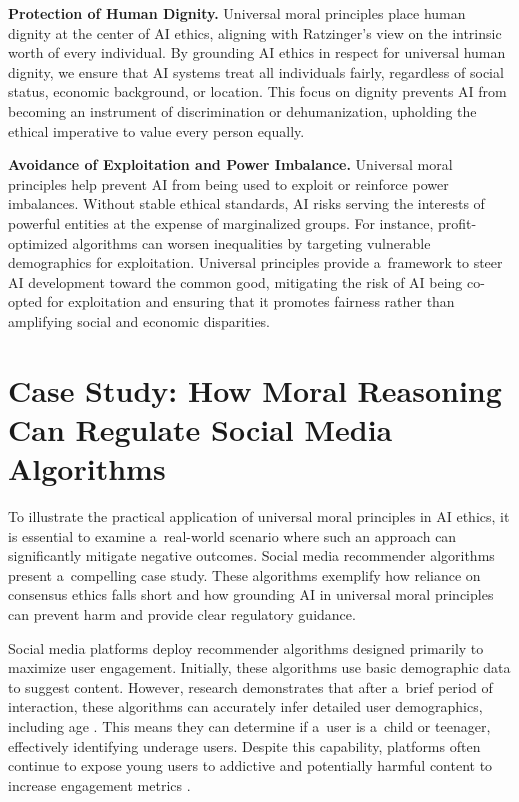 \documentclass[%
  manuscript=article,
  year=2024,
  volume=77,
  doi=10.59203/zfn.77.707,
]{zfn}
\begin{document}
\textbf{Protection of Human Dignity.} Universal moral principles place human dignity at the center of AI ethics, aligning with Ratzinger's view on the intrinsic worth of every individual. By grounding AI ethics in respect for universal human dignity, we ensure that AI systems treat all individuals fairly, regardless of social status, economic background, or location. This focus on dignity prevents AI from becoming an instrument of discrimination or dehumanization, upholding the ethical imperative to value every person equally.



\textbf{Avoidance of Exploitation and Power Imbalance.} Universal moral principles help prevent AI from being used to exploit or reinforce power imbalances. Without stable ethical standards, AI risks serving the interests of powerful entities at the expense of marginalized groups. For instance, profit-optimized algorithms can worsen inequalities by targeting vulnerable demographics for exploitation. Universal principles provide a~framework to steer AI development toward the common good, mitigating the risk of AI being co-opted for exploitation and ensuring that it promotes fairness rather than amplifying social and economic disparities.



\section{Case Study: How Moral Reasoning Can Regulate Social Media Algorithms}



To illustrate the practical application of universal moral principles in AI ethics, it is essential to examine a~real-world scenario where such an approach can significantly mitigate negative outcomes. Social media recommender algorithms present a~compelling case study. These algorithms exemplify how reliance on consensus ethics falls short and how grounding AI in universal moral principles can prevent harm and provide clear regulatory guidance.



Social media platforms deploy recommender algorithms designed primarily to maximize user engagement. Initially, these algorithms use basic demographic data to suggest content. However, research demonstrates that after a~brief period of interaction, these algorithms can accurately infer detailed user demographics, including age 
\parencite[][]{narayanan_understanding_2023}. %
 This means they can determine if a~user is a~child or teenager, effectively identifying underage users. Despite this capability, platforms often continue to expose young users to addictive and potentially harmful content to increase engagement metrics 
\parencite[][]{panoptykon_foundation_fixing_2023}.%
\end{document}

